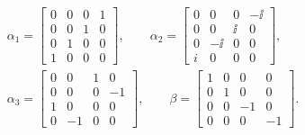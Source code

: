 \begin{equation}
\begin{gathered}
  \alpha_1=
  \begin{bmatrix}
    0&0&0&1\\
    0&0&1&0\\
    0&1&0&0\\
    1&0&0&0
  \end{bmatrix},
  \qquad
  \alpha_2=
  \begin{bmatrix}
    0&0&0&-\ii\\
    0&0&\ii&0\\
    0&-\ii&0&0\\
    i&0&0&0
  \end{bmatrix},\\[1ex]
  \alpha_3=
  \begin{bmatrix}
    0&0&1&0\\
    0&0&0&-1\\
    1&0&0&0\\
    0&-1&0&0
  \end{bmatrix},
  \qquad
  \beta=
  \begin{bmatrix}
    1&0&0&0\\
    0&1&0&0\\
    0&0&-1&0\\
    0&0&0&-1
  \end{bmatrix}.
\end{gathered}
\tag{1.1.18}\label{eq:1.1.18}
\end{equation}

